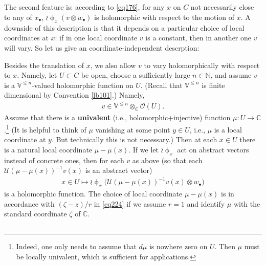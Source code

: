 \documentclass[12pt,a4paper,notitlepage]{article}
\theoremstyle{definition}
\theoremstyle{plain}
\newcommand{\mc}{\mathcal}
\newcommand{\scr}{\mathscr}
\newcommand{\blt}{\bullet}
\newcommand{\Vbb}{\mathbb V}
\newcommand{\Cbb}{\mathbb C}
\newcommand{\Nbb}{\mathbb N}
\numberwithin{equation}{section}
\begin{document}
\subsection{}

The second feature is: according to \eqref{eq176}, for any $x$ on $C$ not necessarily close to any of $x_\blt$, $\wr\upphi_x(v\otimes w_\blt)$ is holomorphic with respect to the motion of $x$. A downside of this description is that it depends on a particular choice of local coordinates at $x$: if in one local coordinate $v$ is a constant, then in another one $v$ will vary. So let us give an coordinate-independent descrption: 

Besides the translation of $x$, we also allow $v$ to vary holomorphically with respect to $x$. Namely, let $U\subset C$ be open, choose a sufficiently large $n\in\Nbb$, and assume $v$ is a $\Vbb^{\leq n}$-valued holomorphic function on $U$. (Recall that $\Vbb^{\leq n}$ is finite dimensional by Convention \ref{lb101}.) Namely,
\begin{align}
v\in\Vbb^{\leq n}\otimes_\Cbb \scr O(U).	
\end{align}
Assume that there is a \textbf{univalent}  (i.e., holomorphic+injective) function $\mu:U\rightarrow\Cbb$.\footnote{Indeed, one only needs to assume that $d\mu$ is nowhere zero on $U$. Then $\mu$ must be locally univalent, which is sufficient for applications.} (It is helpful to think of $\mu$ vanishing at some point $y\in U$, i.e., $\mu$ is a local coordinate at $y$. But technically this is not necessary.) Then at each $x\in U$ there is a natural local coordinate $\mu-\mu(x)$. If we let $\wr\upphi_x$ act on abstract vectors instead of concrete ones, then for each $v$ as above (so that each $\mc U(\mu-\mu(x))^{-1}v(x)$ is an abstract vector)
\begin{align}
x\in U\mapsto \wr\upphi_x\big(\mc U(\mu-\mu(x))^{-1}v(x)\otimes w_\blt\big)	\label{eq178}
\end{align}
is a holomorphic function. The choice of local coordinate $\mu-\mu(x)$ is in accordance with $(\zeta-z)/r$ in \eqref{eq224} if we assume $r=1$ and identify $\mu$ with the standard coordinate $\zeta$ of $\Cbb$.


\subsection{}
\end{document}

